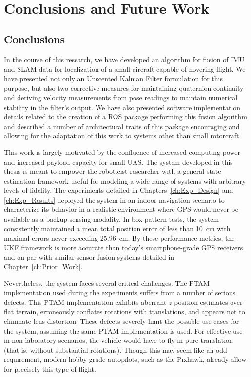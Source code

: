 \chapter{Conclusions and Future Work}

\section{Conclusions}

In the course of this research, we have developed an algorithm for fusion of IMU and SLAM data for localization of a small aircraft capable of hovering flight. We have presented not only an Unscented Kalman Filter formulation for this purpose, but also two corrective measures for maintaining quaternion continuity and deriving velocity measurements from pose readings to maintain numerical stability in the filter's output. We have also presented software implementation details related to the creation of a ROS package performing this fusion algorithm and described a number of architectural traits of this package encouraging and allowing for the adaptation of this work to systems other than small rotorcraft.

This work is largely motivated by the confluence of increased computing power and increased payload capacity for small UAS. The system developed in this thesis is meant to empower the roboticist researcher with a general state estimation framework useful for modeling a wide range of systems with arbitrary levels of fidelity. The experiments detailed in Chapters~\ref{ch:Exp_Design} and \ref{ch:Exp_Results} deployed the system in an indoor navigation scenario to characterize its behavior in a realistic environment where GPS would never be available as a backup sensing modality. In box pattern tests, the system consistently maintained a mean total position error of less than 10~cm with maximal errors never exceeding 25.96~cm. By these performance metrics, the UKF framework is more accurate than today's smartphone-grade GPS receivers and on par with similar sensor fusion systems detailed in Chapter~\ref{ch:Prior_Work}.

Nevertheless, the system faces several critical challenges. The PTAM implementation used during the experiments suffers from a number of serious defects. This PTAM implementation exhibits aberrant $z$-position estimates over flat terrain, erroneously conflates rotations with translations, and appears not to eliminate lens distortion. These defects severely limit the possible use cases for the system, assuming the same PTAM implementation is used. For effective use in non-laboratory scenarios, the vehicle would have to fly in pure translation (that is, without substantial rotations). Though this may seem like an odd requirement, modern hobby-grade autopilots, such as the Pixhawk, already allow for precisely this type of flight.

